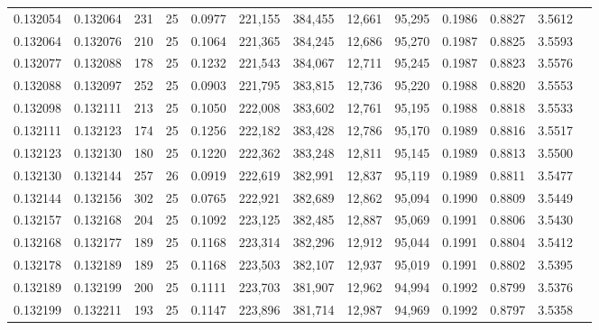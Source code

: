 \begin{tabular}{rrrrrrrrrrrrr}
0.132054 & 0.132064 &   231 &  25 &                                     0.0977 & 221,155 & 384,455 &  12,661 &  95,295 & 0.1986 & 0.8827 & 3.5612 \\
0.132064 & 0.132076 &   210 &  25 &                                     0.1064 & 221,365 & 384,245 &  12,686 &  95,270 & 0.1987 & 0.8825 & 3.5593 \\
0.132077 & 0.132088 &   178 &  25 &                                     0.1232 & 221,543 & 384,067 &  12,711 &  95,245 & 0.1987 & 0.8823 & 3.5576 \\
0.132088 & 0.132097 &   252 &  25 &                                     0.0903 & 221,795 & 383,815 &  12,736 &  95,220 & 0.1988 & 0.8820 & 3.5553 \\
0.132098 & 0.132111 &   213 &  25 &                                     0.1050 & 222,008 & 383,602 &  12,761 &  95,195 & 0.1988 & 0.8818 & 3.5533 \\
0.132111 & 0.132123 &   174 &  25 &                                     0.1256 & 222,182 & 383,428 &  12,786 &  95,170 & 0.1989 & 0.8816 & 3.5517 \\
0.132123 & 0.132130 &   180 &  25 &                                     0.1220 & 222,362 & 383,248 &  12,811 &  95,145 & 0.1989 & 0.8813 & 3.5500 \\
0.132130 & 0.132144 &   257 &  26 &                                     0.0919 & 222,619 & 382,991 &  12,837 &  95,119 & 0.1989 & 0.8811 & 3.5477 \\
0.132144 & 0.132156 &   302 &  25 &                                     0.0765 & 222,921 & 382,689 &  12,862 &  95,094 & 0.1990 & 0.8809 & 3.5449 \\
0.132157 & 0.132168 &   204 &  25 &                                     0.1092 & 223,125 & 382,485 &  12,887 &  95,069 & 0.1991 & 0.8806 & 3.5430 \\
0.132168 & 0.132177 &   189 &  25 &                                     0.1168 & 223,314 & 382,296 &  12,912 &  95,044 & 0.1991 & 0.8804 & 3.5412 \\
0.132178 & 0.132189 &   189 &  25 &                                     0.1168 & 223,503 & 382,107 &  12,937 &  95,019 & 0.1991 & 0.8802 & 3.5395 \\
0.132189 & 0.132199 &   200 &  25 &                                     0.1111 & 223,703 & 381,907 &  12,962 &  94,994 & 0.1992 & 0.8799 & 3.5376 \\
0.132199 & 0.132211 &   193 &  25 &                                     0.1147 & 223,896 & 381,714 &  12,987 &  94,969 & 0.1992 & 0.8797 & 3.5358 \\

\end{tabular}
